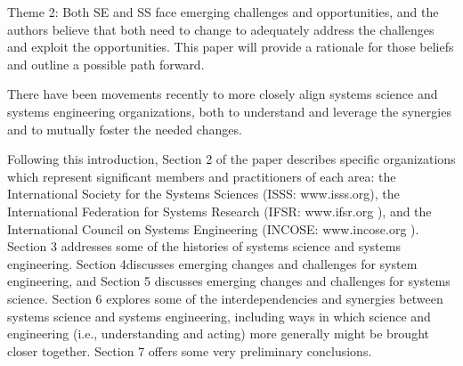 Theme 2: Both SE and SS face emerging challenges and opportunities, and the authors believe that both need to change to adequately address the challenges and exploit the opportunities. This paper will provide a rationale for those beliefs and outline a possible path forward.

There have been movements recently to more closely align systems science and systems engineering organizations, both to understand and leverage the synergies and to mutually foster the needed changes.

Following this introduction, Section 2 of the paper describes specific organizations which represent significant members and practitioners of each area: the International Society for the Systems Sciences (ISSS: www.isss.org), the International Federation for Systems Research (IFSR: www.ifsr.org ), and the International Council on Systems Engineering (INCOSE: www.incose.org ). Section 3 addresses some of the histories of systems science and systems engineering. Section 4discusses emerging changes and challenges for system engineering, and Section 5 discusses emerging changes and challenges for systems science. Section 6 explores some of the interdependencies and synergies between systems science and systems engineering, including ways in which science and engineering (i.e., understanding and acting) more generally might be brought closer together. Section 7 offers some very preliminary conclusions.